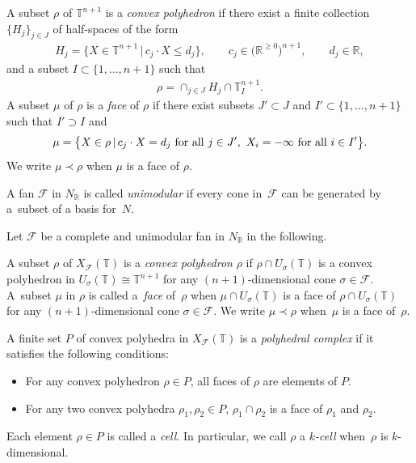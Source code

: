 \documentclass[pdftex]{sigma}
\numberwithin{equation}{section}
\begin{document}
\begin{Definition} A subset $\rho$ of ${\mathbb T}^{n+1}$ is a \textit{convex polyhedron} if there exist a f\/inite collection $\{H_j\}_{j \in J}$ of half-spaces of the form
\begin{gather*}
H_j=\big\{ X \in {\mathbb T}^{n+1} \,|\, c_j \cdot X \leq d_j \big\}, \qquad c_j \in \big({\mathbb R}^{\geq 0}\big)^{n+1}, \qquad d_j \in {\mathbb R},
\end{gather*}
and a subset $I \subset \{1, \dots, n+1 \}$ such that
\begin{gather*}
\rho = \cap_{j \in J} H_j \cap {\mathbb T}_I^{n+1}.
\end{gather*}
A subset $\mu$ of $\rho$ is a \textit{face} of $\rho$ if there exist subsets $J' \subset J$ and $I' \subset \{1, \dots, n+1 \}$ such that $I' \supset I$ and
\begin{gather*}
\mu=\big\{ X \in \rho \,|\,
c_j \cdot X = d_j \ {\rm for\ all}\ j \in J', \ X_i =-\infty \ {\rm for\ all}\ i \in I'\big\}.
\end{gather*}
We write $\mu \prec \rho$ when $\mu$ is a face of $\rho$.
\end{Definition}

\begin{Definition}
A fan ${\mathcal F}$ in $N_{\mathbb R}$ is called {\it unimodular} if every cone in~${\mathcal F}$ can be generated by a~subset of a basis for~$N$.
\end{Definition}

Let ${\mathcal F}$ be a complete and unimodular fan in $N_{\mathbb R}$ in the following.

\begin{Definition} A subset $\rho$ of $X_{\mathcal F}({\mathbb T})$ is a \textit{convex polyhedron} $\rho$ if $\rho \cap U_\sigma({\mathbb T})$ is a convex polyhedron in $U_\sigma({\mathbb T}) \cong {\mathbb T}^{n+1}$ for any $(n+1)$-dimensional cone $\sigma \in {\mathcal F}$. A~subset $\mu$ in $\rho$ is called a~\textit{face} of~$\rho$ when $\mu \cap U_\sigma({\mathbb T})$ is a face of $\rho \cap U_\sigma({\mathbb T})$ for any $(n+1)$-dimensional cone $\sigma \in {\mathcal F}$. We write $\mu \prec \rho$ when~$\mu$ is a face of~$\rho$.
\end{Definition}

\begin{Definition}\label{df:cpx}
A f\/inite set $P$ of convex polyhedra in $X_{\mathcal F}({\mathbb T})$ is a \textit{polyhedral complex} if it satisf\/ies the following conditions:
\begin{itemize}\itemsep=0pt
\item For any convex polyhedron $\rho \in P$, all faces of $\rho$ are elements of $P$.
\item For any two convex polyhedra $\rho_1, \rho_2 \in P$, $\rho_1 \cap \rho_2$ is a face of $\rho_1$ and $\rho_2$.
\end{itemize}
Each element $\rho \in P$ is called a \textit{cell}. In particular, we call $\rho$ a \textit{$k$-cell} when~$\rho$ is $k$-dimensional.
\end{Definition}
\end{document}
